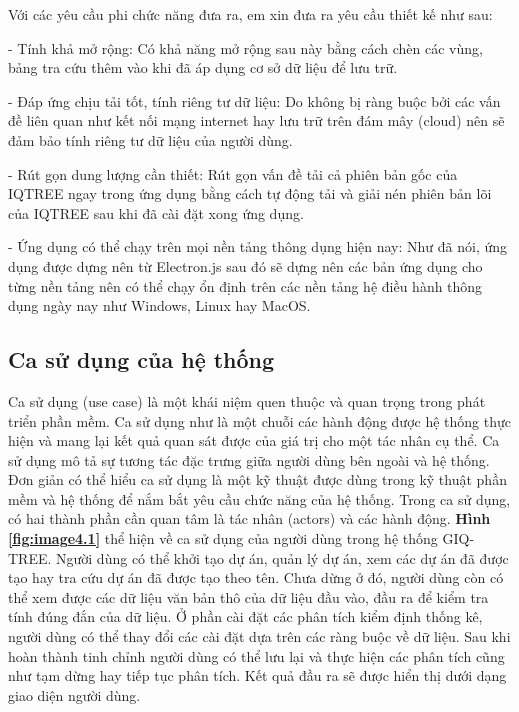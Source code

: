 \documentclass[12pt]{report}
\begin{document}
Với các yêu cầu phi chức năng đưa ra, em xin đưa ra yêu cầu thiết kế như sau:

- Tính khả mở rộng: Có khả năng mở rộng sau này bằng cách chèn các vùng, bảng tra cứu thêm vào khi đã áp dụng cơ sở dữ liệu để lưu trữ.

- Đáp ứng chịu tải tốt, tính riêng tư dữ liệu: Do không bị ràng buộc bởi các vấn đề liên quan như kết nối mạng internet hay lưu trữ trên đám mây (cloud) nên sẽ đảm bảo tính riêng tư dữ liệu của người dùng.

- Rút gọn dung lượng cần thiết: Rút gọn vấn đề tải cả phiên bản gốc của IQTREE ngay trong ứng dụng bằng cách tự động tải và giải nén phiên bản lõi của IQTREE sau khi đã cài đặt xong ứng dụng.

- Ứng dụng có thể chạy trên mọi nền tảng thông dụng hiện nay: Như đã nói, ứng dụng được dựng nên từ Electron.js sau đó sẽ dựng nên các bản ứng dụng cho từng nền tảng nên có thể chạy ổn định trên các nền tảng hệ điều hành thông dụng ngày nay như Windows, Linux hay MacOS.
\subsection{Ca sử dụng của hệ thống}
Ca sử dụng (use case) là một khái niệm quen thuộc và quan trọng trong phát triển phần mềm. Ca sử dụng như là một chuỗi các hành động được hệ thống thực hiện và mang lại kết quả quan sát được của giá trị cho một tác nhân cụ thể. Ca sử dụng mô tả sự tương tác đặc trưng giữa người dùng bên ngoài và hệ thống. Đơn giản có thể hiểu ca sử dụng là một kỹ thuật được dùng trong kỹ thuật phần mềm và hệ thống để nắm bắt yêu cầu chức năng của hệ thống. Trong ca sử dụng, có hai thành phần cần quan tâm là tác nhân (actors) và các hành động. \textbf{Hình \ref{fig:image4.1}} thể hiện về ca sử dụng của người dùng trong hệ thống GIQ-TREE. Người dùng có thể khởi tạo dự án, quản lý dự án, xem các dự án đã được tạo hay tra cứu dự án đã được tạo theo tên. Chưa dừng ở đó, người dùng còn có thể xem được các dữ liệu văn bản thô của dữ liệu đầu vào, đầu ra để kiểm tra tính đúng đắn của dữ liệu. Ở phần cài đặt các phân tích kiểm định thống kê, người dùng có thể thay đổi các cài đặt dựa trên các ràng buộc về dữ liệu. Sau khi hoàn thành tinh chỉnh người dùng có thể lưu lại và thực hiện các phân tích cũng như tạm dừng hay tiếp tục phân tích. Kết quả đầu ra sẽ được hiển thị dưới dạng giao diện người dùng.
\end{document}
